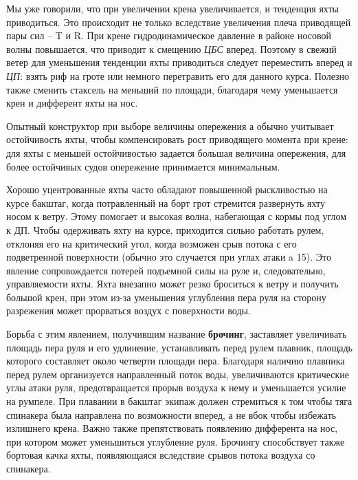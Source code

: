 Мы уже говорили, что при увеличении крена увеличивается, и тенденция яхты приводиться. Это происходит не только вследствие увеличения плеча приводящей пары сил \--- \ve T и \ve R. При крене гидродинамическое давление в районе носовой волны повышается, что приводит к смещению \textit{ЦБС} вперед. Поэтому в свежий ветер для уменьшения тенденции яхты приводиться следует переместить вперед и \textit{ЦП}: взять риф на гроте или немного перетравить его для данного курса. Полезно также сменить стаксель на меньший по площади, благодаря чему уменьшается крен и дифферент яхты на нос.

Опытный конструктор при выборе величины опережения а обычно учитывает остойчивость яхты, чтобы компенсировать рост приводящего момента при крене: для яхты с меньшей остойчивостью задается большая величина опережения, для более остойчивых судов опережение принимается минимальным.

Хорошо уцентрованные яхты часто обладают повышенной рыскливостью на курсе бакштаг, когда потравленный на борт грот стремится развернуть яхту носом к ветру. Этому помогает и высокая волна, набегающая с кормы под углом к ДП. Чтобы одерживать яхту на курсе, приходится сильно работать рулем, отклоняя его на критический угол, когда возможен срыв потока с его подветренной поверхности (обычно это случается при углах атаки a 15\gr). Это явление сопровождается потерей подъемной силы на руле и, следовательно, управляемости яхты. Яхта внезапно может резко броситься к ветру и получить большой крен, при этом из-за уменьшения углубления пера руля на сторону разрежения может прорваться воздух с поверхности воды. 

Борьба с этим явлением, получившим название \textbf{брочинг}, заставляет увеличивать площадь пера руля и его удлинение, устанавливать перед рулем плавник, площадь которого составляет около четверти площади пера. Благодаря наличию плавника перед рулем организуется направленный поток воды, увеличиваются критические углы атаки руля, предотвращается прорыв воздуха к нему и уменьшается усилие на румпеле. При плавании в бакштаг экипаж должен стремиться к том чтобы тяга спинакера была направлена по возможности вперед, а не вбок чтобы избежать излишнего крена. Важно также препятствовать появлению дифферента на нос, при котором может уменьшиться углубление руля. Брочингу способствует также бортовая качка яхты, появляющаяся вследствие срывов потока воздуха со спинакера.

